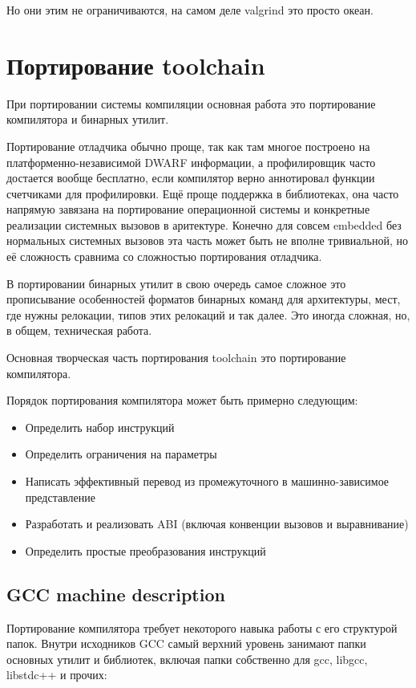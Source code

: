 \documentclass[a4paper,12pt,oneside]{article}
\begin{document}
Но они этим не ограничиваются, на самом деле valgrind это просто океан.

\pagebreak
\section{Портирование toolchain}

При портировании системы компиляции основная работа это портирование компилятора и бинарных утилит. 

Портирование отладчика обычно проще, так как там многое построено на платформенно-независимой DWARF информации, а профилировщик часто достается вообще бесплатно, если компилятор верно аннотировал функции счетчиками для профилировки. Ещё проще поддержка в библиотеках, она часто напрямую завязана на портирование операционной системы и конкретные реализации системных вызовов в аритектуре. Конечно для совсем embedded без нормальных системных вызовов эта часть может быть не вполне тривиальной, но её сложность сравнима со сложностью портирования отладчика.

В портировании бинарных утилит в свою очередь самое сложное это прописывание особенностей форматов бинарных команд для архитектуры, мест, где нужны релокации, типов этих релокаций и так далее. Это иногда сложная, но, в общем, техническая работа.

Основная творческая часть портирования toolchain это портирование компилятора.

Порядок портирования компилятора может быть примерно следующим:

\begin{itemize}
\item Определить набор инструкций
\item Определить ограничения на параметры
\item Написать эффективный перевод из промежуточного в машинно-зависимое представление
\item Разработать и реализовать ABI (включая конвенции вызовов и выравнивание)
\item Определить простые преобразования инструкций
\end{itemize}

\pagebreak
\subsection{GCC machine description}

Портирование компилятора требует некоторого навыка работы с его структурой папок. Внутри исходников GCC самый верхний уровень занимают папки основных утилит и библиотек, включая папки собственно для gcc, libgcc, libstdc++ и прочих: 
\end{document}
